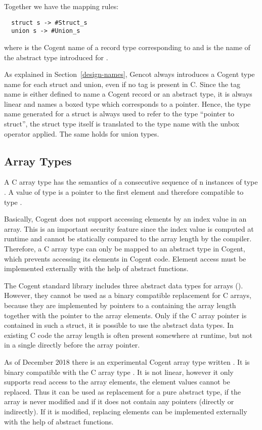 Together we have the mapping rules:
\begin{verbatim}
  struct s -> #Struct_s
  union s -> #Union_s
\end{verbatim}
where  is the Cogent name of a record type corresponding to  and  is the
name of the abstract type introduced for .

As explained in Section~\ref{design-names}, Gencot always introduces a Cogent type name for each struct and union,
even if no tag is present in C. Since the tag name is either defined to name a Cogent record or an abstract type,
it is always linear and names a boxed type which corresponds to a pointer. Hence, the type name generated for a struct
is always used to refer to the type ``pointer to struct'', the struct type itself is translated to the type name 
with the unbox operator applied. The same holds for union types.

\subsection{Array Types}
\label{design-types-array}

A C array type  has the semantics of a consecutive sequence of n instances of type . A value
of type  is a pointer to the first element and therefore compatible to type .

Basically, Cogent does not support accessing elements by an index value in an array. 
This is an important security feature since the index value is computed at runtime and cannot be statically 
compared to the array length by the compiler. Therefore, a C array type can only be mapped to an abstract type 
in Cogent, which prevents accessing its elements in Cogent code. Element access must be implemented externally 
with the help of abstract functions.

The Cogent standard library includes three abstract data types for arrays (). 
However, they cannot be used as a binary compatible replacement for C arrays, because they are implemented by 
pointers to a  containing the array length together with the pointer to the array elements. 
Only if the C array pointer is contained in such a struct, it is possible to use the abstract data types. 
In existing C code the array length is often present somewhere at runtime, but not in a single 
directly before the array pointer.

As of December 2018 there is an experimental Cogent array type written . It is binary compatible 
with the C array type . It is not linear, however it only supports read access to the array elements, 
the element values cannot be replaced. Thus it can be used as replacement for a pure abstract type, if the array 
is never modified and if it does not contain any pointers (directly or indirectly). If it is modified, replacing
elements can be implemented externally with the help of abstract functions.


